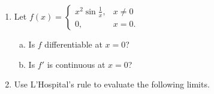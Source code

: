 \documentclass[journal,12pt,onecolumn]{IEEEtran}
\begin{document}
\begin{enumerate}
\begin{enumerate}[(i)]
\end{enumerate}

\item Let 
 $
f(x)=\begin{cases}
x^2 \sin \frac{1}{x},& x\neq0 \\
0,&x=0.
\end{cases}
$


\setlength\itemsep{2em}
\begin{enumerate}[(a).]

\item Is $f$ differentiable at $x=0$?
\item Is $f'$ is continuous at $x=0$?
\end{enumerate}

\item Use L'Hospital's rule to evaluate the following limits.

\begin{enumerate}[(i)]
\end{enumerate}

\end{enumerate}
\end{document}
